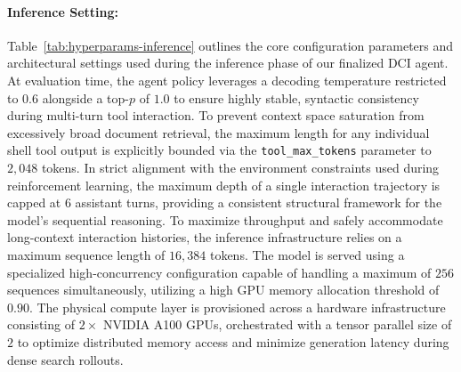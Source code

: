 \documentclass{llmxive}
\begin{document}
\paragraph{Inference Setting:} 

Table~\ref{tab:hyperparams-inference} outlines the core configuration parameters and architectural settings used during the inference phase of our finalized DCI agent. At evaluation time, the agent policy leverages a decoding temperature restricted to $0.6$ alongside a top-$p$ of $1.0$ to ensure highly stable, syntactic consistency during multi-turn tool interaction. To prevent context space saturation from excessively broad document retrieval, the maximum length for any individual shell tool output is explicitly bounded via the \texttt{tool\_max\_tokens} parameter to $2,048$ tokens. In strict alignment with the environment constraints used during reinforcement learning, the maximum depth of a single interaction trajectory is capped at $6$ assistant turns, providing a consistent structural framework for the model's sequential reasoning. To maximize throughput and safely accommodate long-context interaction histories, the inference infrastructure relies on a maximum sequence length of $16,384$ tokens. The model is served using a specialized high-concurrency configuration capable of handling a maximum of $256$ sequences simultaneously, utilizing a high GPU memory allocation threshold of $0.90$. The physical compute layer is provisioned across a hardware infrastructure consisting of $2\times$ NVIDIA A100 GPUs, orchestrated with a tensor parallel size of $2$ to optimize distributed memory access and minimize generation latency during dense search rollouts.
\end{document}
